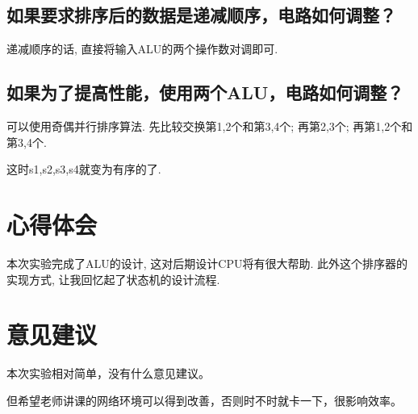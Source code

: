 \documentclass[UTF8]{article}
\begin{document}
\subsection{如果要求排序后的数据是递减顺序，电路如何调整？}
递减顺序的话, 直接将输入ALU的两个操作数对调即可.
\subsection{如果为了提高性能，使用两个ALU，电路如何调整？}
可以使用奇偶并行排序算法. 先比较交换第1,2个和第3,4个; 再第2,3个; 再第1,2个和第3,4个.\par
这时s1,s2,s3,s4就变为有序的了.\par

\section{心得体会}
本次实验完成了ALU的设计, 这对后期设计CPU将有很大帮助. 此外这个排序器的实现方式, 让我回忆起了状态机的设计流程.

\section{意见建议}
本次实验相对简单，没有什么意见建议。\par
但希望老师讲课的网络环境可以得到改善，否则时不时就卡一下，很影响效率。
\end{document}
